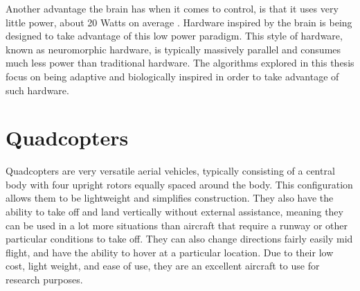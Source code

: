 \documentclass[letterpaper,12pt,titlepage,oneside,final]{book}
\begin{document}
Another advantage the brain has when it comes to control, is that it uses very little power, about 20 Watts on average \cite{hart1975brain}.
Hardware inspired by the brain is being designed to take advantage of this low power paradigm. 
This style of hardware, known as neuromorphic hardware, is typically massively parallel and consumes much less power than traditional hardware.
The algorithms explored in this thesis focus on being adaptive and biologically inspired in order to take advantage of such hardware.

\section{Quadcopters}


Quadcopters are very versatile aerial vehicles, typically consisting of a central body with four upright rotors equally spaced around the body. 
This configuration allows them to be lightweight and simplifies construction. 
They also have the ability to take off and land vertically without external assistance, meaning they can be used in a lot more situations than aircraft that require a runway or other particular conditions to take off. 
They can also change directions fairly easily mid flight, and have the ability to hover at a particular location. Due to their low cost, light weight, and ease of use, they are an excellent aircraft to use for research purposes.
\end{document}
